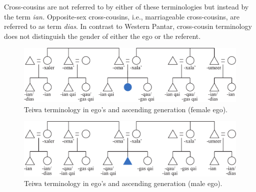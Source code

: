 Cross-cousins are not referred to by either of these terminologies but instead by the term \textit{ian.} Opposite-sex cross-cousins, i.e., marriageable cross-cousins, are referred to as term \textit{dias}. In contrast to Western Pantar, cross-cousin terminology does not distinguish the gender of either the ego or the referent.

\begin{figure}
\includegraphics[width=\textwidth]{figures/Holton_ch5_fig5.pdf}
\caption{Teiwa terminology in ego's and ascending generation (female ego). }
\label{fig:5:5}
\end{figure}   

\begin{figure}
\includegraphics[width=\textwidth]{figures/Holton_ch5_fig6.pdf}
\caption{Teiwa terminology in ego's and ascending generation (male ego). }
\label{fig:5:6}
\end{figure}  
 

